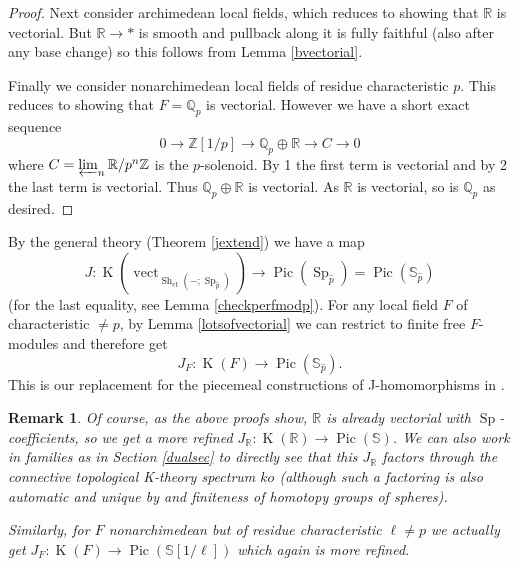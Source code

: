 \documentclass[12pt]{article}
\newtheorem{remark}[theorem]{Remark}
\newcommand{\on}{\operatorname}
\newcommand{\mbb}{\mathbb}
\newcommand{\wh}{\widehat}
\begin{document}
\begin{proof}
Next consider archimedean local fields, which reduces to showing that $\mbb{R}$ is vectorial.  But $\mbb{R}\to \ast$ is smooth and pullback along it is fully faithful (also after any base change) so this follows from Lemma \ref{bvectorial}.

Finally we consider nonarchimedean local fields of residue characteristic $p$.  This reduces to showing that $F=\mbb{Q}_p$ is vectorial.  However we have a short exact sequence
$$0\to \mbb{Z}[1/p] \to \mbb{Q}_p\oplus \mbb{R} \to C\to 0$$
where $C  = \varprojlim_n \mbb{R}/p^n\mbb{Z}$ is the $p$-solenoid.  By 1 the first term is vectorial and by 2 the last term is vectorial.  Thus $\mbb{Q}_p\oplus\mbb{R}$ is vectorial.  As $\mbb{R}$ is vectorial, so is $\mbb{Q}_p$ as desired.
\end{proof}

By the general theory (Theorem \ref{jextend}) we have a map
$$J:\on{K}(\on{vect}_{\on{Sh}_{et}(-;\on{Sp}_{\wh{p}})})\to \on{Pic}(\on{Sp}_{\wh{p}})= \on{Pic}(\mbb{S}_{\wh{p}})$$
(for the last equality, see Lemma \ref{checkperfmodp}).  For any local field $F$ of characteristic $\neq p$, by Lemma \ref{lotsofvectorial} we can restrict to finite free $F$-modules and therefore get
$$J_F:\on{K}(F) \to \on{Pic}(\mbb{S}_{\wh{p}}).$$
This is our replacement for the piecemeal constructions of J-homomorphisms in \cite{ClausenJ}.

\begin{remark}
Of course, as the above proofs show, $\mbb{R}$ is already vectorial with $\on{Sp}$-coefficients, so we get a more refined $J_{\mbb{R}}:\on{K}(\mbb{R})\to \on{Pic}(\mbb{S})$.  We can also work in families as in Section \ref{dualsec} to directly see that this $J_{\mbb{R}}$ factors through the connective topological K-theory spectrum $ko$ (although such a factoring is also automatic and unique by \cite{SuslinK} and finiteness of homotopy groups of spheres).

Similarly, for $F$ nonarchimedean but of residue characteristic $\ell\neq p$ we actually get $J_F:\on{K}(F)\to \on{Pic}(\mbb{S}[1/\ell])$ which again is more refined.
\end{remark}
\end{document}
